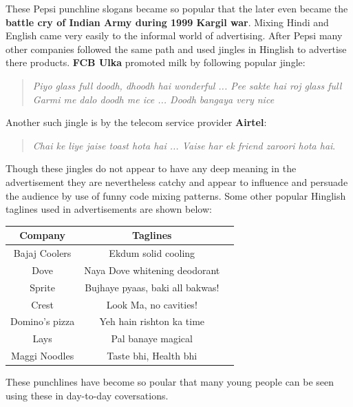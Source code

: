 \documentclass{article}
\begin{document}
These Pepsi punchline slogans became so popular that the later even became the \textbf{battle cry of Indian Army during 1999 Kargil war}. Mixing Hindi and English came very easily to the informal world of advertising. After Pepsi many other companies followed the same path and used jingles in Hinglish to advertise there products. \textbf{FCB Ulka} promoted milk by following popular jingle:
\begin{quote}
    \centering
    \textit{Piyo glass full doodh, dhoodh hai wonderful ... Pee sakte hai roj glass full\\
        Garmi me dalo doodh me ice ... Doodh bangaya very nice}

\end{quote}
Another such jingle is by the telecom service provider \textbf{Airtel}:
\begin{quote}
    \centering
    \textit{Chai ke liye jaise toast hota hai ... Vaise har ek friend zaroori hota hai}.
\end{quote}
Though these jingles do not appear to have any deep meaning in the advertisement they are nevertheless catchy and appear to influence and persuade the audience by use of funny code mixing patterns. Some other popular Hinglish taglines used in advertisements are shown below:
\begin{table}[H]
    \centering
    \begin{tabular}{|c|c|c|}
        \hline
        \textbf{Company} & \textbf{Taglines}               \\
        \hline \hline
        Bajaj Coolers    & Ekdum solid cooling             \\\hline
        Dove             & Naya Dove whitening deodorant   \\\hline
        Sprite           & Bujhaye pyaas, baki all bakwas! \\\hline
        Crest            & Look Ma, no cavities!           \\\hline
        Domino’s pizza   & Yeh hain rishton ka time        \\\hline
        Lays             & Pal banaye magical              \\\hline
        Maggi Noodles    & Taste bhi, Health bhi           \\\hline
    \end{tabular}
\end{table}
These punchlines have become so poular that many young people can be seen using these in day-to-day coversations.\\
\end{document}
